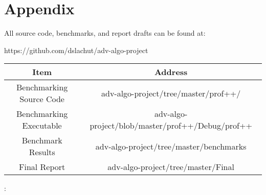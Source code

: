 \section*{Appendix}
  
  All source code, benchmarks, and report drafts can be found at:
  
  https://github.com/dslachut/adv-algo-project
  
  \begin{tabular}{c|c}
    Item & Address\\\hline
    Benchmarking Source Code&adv-algo-project/tree/master/prof++/ \\
    Benchmarking Executable&adv-algo-project/blob/master/prof++/Debug/prof++\\
    Benchmark Results&adv-algo-project/tree/master/benchmarks\\
    Final Report&adv-algo-project/tree/master/Final
  \end{tabular}
:
